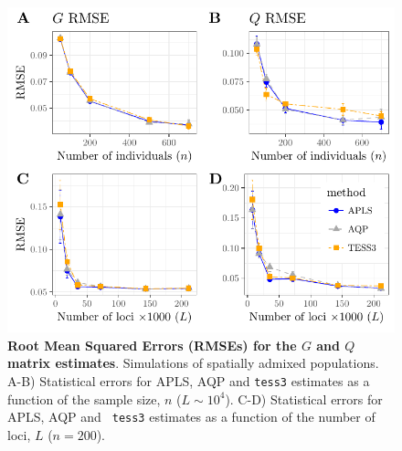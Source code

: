 \clearpage 
\newpage


\begin{figure}
  \centering
  \includegraphics[width=\textwidth]{./Figures/figure1.pdf}
  \caption{{\bf Root Mean Squared Errors (RMSEs) for the $G$ and $Q$ matrix
      estimates}. Simulations of spatially admixed populations. A-B) Statistical
    errors for APLS, AQP and {\tt tess3} estimates as a function of the sample
    size, $n$ ($L \sim 10^4$). C-D) Statistical errors for APLS, AQP and {\tt
      tess3} estimates as a function of the number of loci, $L$ ($n = 200$).}
  \label{fig:fig1}
\end{figure}  

\clearpage 
\newpage

